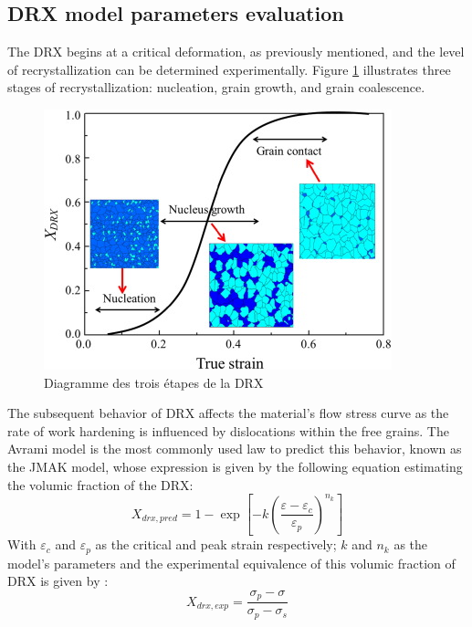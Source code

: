 \documentclass[metals,article,submit,pdftex,moreauthors]{Definitions/mdpi}
\begin{document}
\subsection{DRX model parameters evaluation\label{subsec:DRXparams}}
The DRX begins at a critical deformation, as previously mentioned, and the level of recrystallization can be determined experimentally. Figure \ref{fig:DRXschema} illustrates three stages of recrystallization: nucleation, grain growth, and grain coalescence.
\begin{figure}[!ht]
\includegraphics[width=0.7\columnwidth]{Figures/picDRX}
\caption[Diagramme des trois étapes de la DRX]{Diagramme des trois étapes de la DRX \cite{wan2017experimental}}
\label{fig:DRXschema}
\end{figure}
The subsequent behavior of DRX affects the material's flow stress curve as the rate of work hardening is influenced by dislocations within the free grains. The Avrami model is the most commonly used law to predict this behavior, known as the JMAK model, whose expression is given by the following equation estimating the volumic fraction of the DRX:
\begin{equation}
X_{drx,pred} = 1 - \exp\left[ -k\left(\frac{\varepsilon - \varepsilon_c}{\varepsilon_p}\right)^{n_k}\right]
\label{eq:drxpred}
\end{equation}
With $\varepsilon_c$ and $\varepsilon_p$ as the critical and peak strain respectively; $k$ and $n_k$ as the model's parameters and the experimental equivalence of this volumic fraction of DRX is given by :
\begin{equation}
X_{drx,exp} = \frac{\sigma_p-\sigma}{\sigma_p-\sigma_{s}}
\label{eq:drxexp}
\end{equation}
\end{document}
